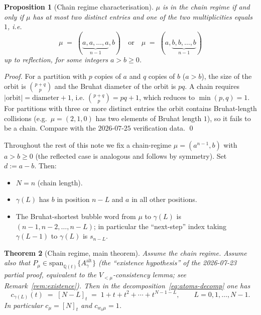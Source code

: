 \documentclass[11pt]{article}
\newtheorem{theorem}{Theorem}
\newtheorem{proposition}[theorem]{Proposition}
\newcommand{\Aalt}{A^{\mathrm{alt}}}
\newcommand{\gauss}[1]{[#1]_t}
\begin{document}
\begin{proposition}[Chain regime characterisation]\label{prop:chain-char}
$\mu$ is in the chain regime if and only if $\mu$ has at most two distinct
entries and one of the two multiplicities equals $1$, i.e.
\[
  \mu \;=\; (\underbrace{a, a, \ldots, a}_{n-1}, b) \quad\text{or}\quad
  \mu \;=\; (a, \underbrace{b, b, \ldots, b}_{n-1})
\]
up to reflection, for some integers $a > b \ge 0$.
\end{proposition}

\begin{proof}
For a partition with $p$ copies of $a$ and $q$ copies of $b$ ($a > b$), the
size of the orbit is $\binom{p+q}{p}$ and the Bruhat diameter of the orbit
is $pq$.  A chain requires $|\mathrm{orbit}| = \text{diameter}+1$, i.e.
$\binom{p+q}{p} = pq + 1$, which reduces to $\min(p,q) = 1$.  For
partitions with three or more distinct entries the orbit contains
Bruhat-length collisions (e.g.\ $\mu = (2,1,0)$ has two elements of Bruhat
length $1$), so it fails to be a chain.  Compare with the $2026$-$07$-$25$
verification data. \qed
\end{proof}

\medskip

Throughout the rest of this note we fix a chain-regime $\mu = (a^{n-1}, b)$
with $a > b \ge 0$ (the reflected case is analogous and follows by symmetry).
Set $d := a - b$.  Then:
\begin{itemize}
\item $N = n$ (chain length).
\item $\gamma(L)$ has $b$ in position $n - L$ and $a$ in all other positions.
\item The Bruhat-shortest bubble word from $\mu$ to $\gamma(L)$ is
$(n-1, n-2, \ldots, n-L)$; in particular the ``next-step'' index taking
$\gamma(L-1)$ to $\gamma(L)$ is $s_{n-L}$.
\end{itemize}

\begin{theorem}[Chain regime, main theorem]\label{thm:main}
Assume the chain regime.  Assume also that $P_\mu \in \mathrm{span}_{\mathbb Q(t)}\{\Aalt_\gamma\}$
(the ``existence hypothesis'' of the 2026-07-23 partial proof, equivalent
to the $V_{<\mu}$-consistency lemma; see Remark~\ref{rem:existence}).
Then in the decomposition~\eqref{eq:atoms-decomp} one has
\[
  c_{\gamma(L)}(t) \;=\; \gauss{N - L} \;=\; 1 + t + t^2 + \cdots + t^{N-1-L}, \qquad L = 0, 1, \ldots, N-1.
\]
In particular $c_\mu = \gauss{N}$ and $c_{w_0 \mu} = 1$.
\end{theorem}
\end{document}
